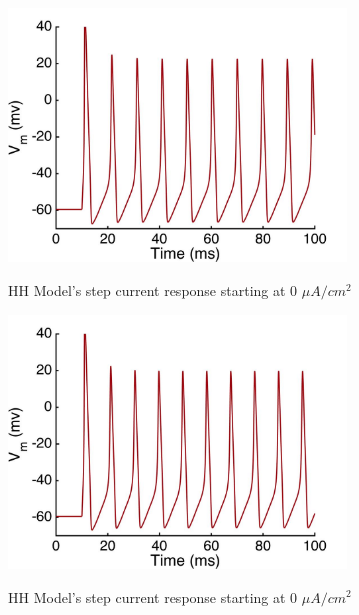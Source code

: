 \documentclass{beamer}
\begin{document}
\begin{frame}
  \begin{figure}
    \centering
    \includegraphics[width = 0.8\textwidth]{./images/current_0_35.jpg}

    HH Model's step current response starting at 0 $\mu A/cm^2$
  \end{figure}
\end{frame}

\begin{frame}
  \begin{figure}
    \centering
    \includegraphics[width = 0.8\textwidth]{./images/current_0_40.jpg}

    HH Model's step current response starting at 0 $\mu A/cm^2$
  \end{figure}
\end{frame}
\end{document}
